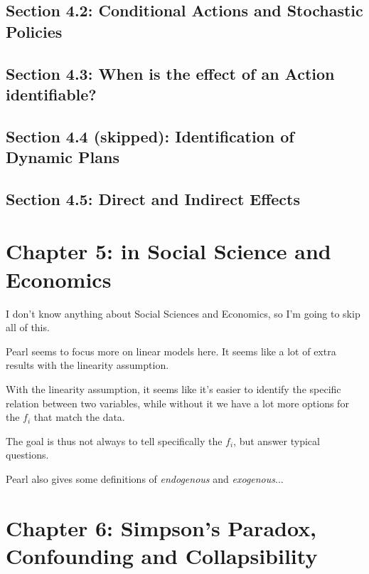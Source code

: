 \documentclass[oneside]{book}
\begin{document}


\section{Section 4.2: Conditional Actions and Stochastic Policies}



\section{Section 4.3: When is the effect of an Action identifiable?}



\section{Section 4.4 (skipped): Identification of Dynamic Plans}



\section{Section 4.5: Direct and Indirect Effects}



\chapter{Chapter 5: in Social Science and Economics}

I don't know anything about Social Sciences and Economics, so I'm going to skip all of this.

Pearl seems to focus more on linear models here. It seems like a lot of extra results with the linearity assumption.

With the linearity assumption, it seems like it's easier to identify the specific relation between two variables, while without it we have a lot more options for the $f_i$ that match the data.

The goal is thus not always to tell specifically the $f_i$, but answer typical questions.

Pearl also gives some definitions of \textit{endogenous} and \textit{exogenous}...


\chapter{Chapter 6: Simpson's Paradox, Confounding and Collapsibility}
\end{document}
